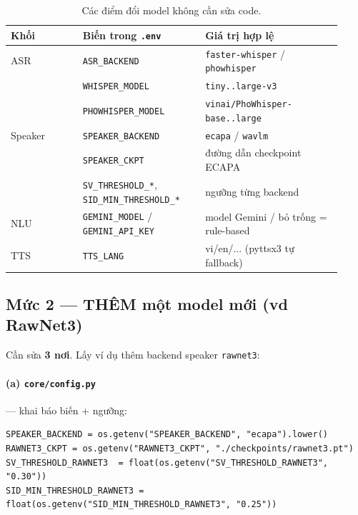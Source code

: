 \documentclass[12pt,a4paper]{article}
\begin{document}
\begin{table}[H]
\centering\small
\begin{tabular}{p{0.20\linewidth}p{0.34\linewidth}p{0.38\linewidth}}
\toprule
\textbf{Khối} & \textbf{Biến trong \texttt{.env}} & \textbf{Giá trị hợp lệ} \\
\midrule
ASR & \texttt{ASR\_BACKEND} & \texttt{faster-whisper} / \texttt{phowhisper} \\
& \texttt{WHISPER\_MODEL} & \texttt{tiny..large-v3} \\
& \texttt{PHOWHISPER\_MODEL} & \texttt{vinai/PhoWhisper-base..large} \\
Speaker & \texttt{SPEAKER\_BACKEND} & \texttt{ecapa} / \texttt{wavlm} \\
& \texttt{SPEAKER\_CKPT} & đường dẫn checkpoint ECAPA \\
& \texttt{SV\_THRESHOLD\_*}, \texttt{SID\_MIN\_THRESHOLD\_*} & ngưỡng từng backend \\
NLU & \texttt{GEMINI\_MODEL} / \texttt{GEMINI\_API\_KEY} & model Gemini / bỏ trống = rule-based \\
TTS & \texttt{TTS\_LANG} & vi/en/... (pyttsx3 tự fallback) \\
\bottomrule
\end{tabular}
\caption{Các điểm đổi model không cần sửa code.}
\end{table}

\subsection{Mức 2 --- THÊM một model mới (vd RawNet3)}
Cần sửa \textbf{3 nơi}. Lấy ví dụ thêm backend speaker \texttt{rawnet3}:

\paragraph{(a) \texttt{core/config.py}} --- khai báo biến + ngưỡng:
\begin{lstlisting}
SPEAKER_BACKEND = os.getenv("SPEAKER_BACKEND", "ecapa").lower()
RAWNET3_CKPT = os.getenv("RAWNET3_CKPT", "./checkpoints/rawnet3.pt")
SV_THRESHOLD_RAWNET3  = float(os.getenv("SV_THRESHOLD_RAWNET3", "0.30"))
SID_MIN_THRESHOLD_RAWNET3 = float(os.getenv("SID_MIN_THRESHOLD_RAWNET3", "0.25"))
\end{lstlisting}
\end{document}
